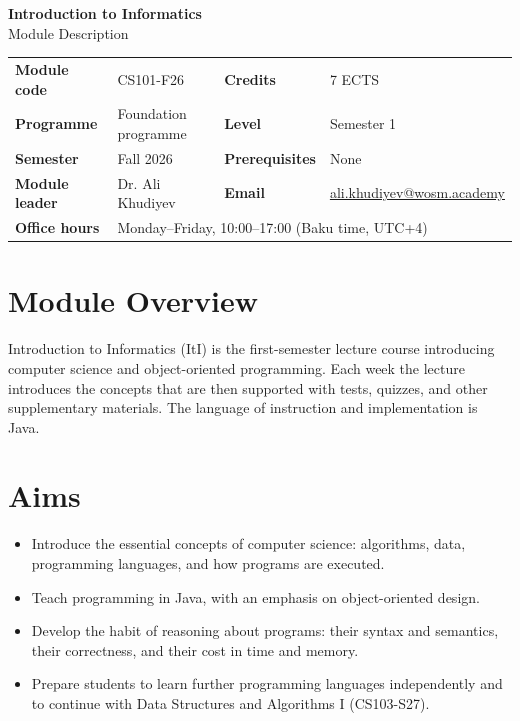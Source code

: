 \documentclass[11pt,a4paper]{article}
\makeatletter
\newcommand{\ModuleTitle}{Introduction to Informatics}
\newcommand{\ModuleCode}{CS101-F26}
\newcommand{\Programme}{Foundation programme}
\newcommand{\Level}{Semester 1}
\newcommand{\Semester}{Fall 2026}
\newcommand{\Credits}{7 ECTS}
\newcommand{\ModuleLeader}{Dr. Ali Khudiyev}
\newcommand{\Email}{ali.khudiyev@wosm.academy}
\newcommand{\OfficeHours}{Monday--Friday, 10:00--17:00 (Baku time, UTC+4)}
\newcommand{\Prerequisites}{None}
\makeatother
\begin{document}
\begin{center}
  {\LARGE\bfseries\color{accent} \ModuleTitle}\\[4pt]
  {\large Module Description}
\end{center}
\vspace{6pt}

\begin{tabularx}{\textwidth}{>{\bfseries}l X >{\bfseries}l X}
\toprule
Module code   & \ModuleCode    & Credits      & \Credits \\
Programme     & \Programme     & Level        & \Level \\
Semester      & \Semester      & Prerequisites & \Prerequisites \\
Module leader & \ModuleLeader  & Email        & \href{mailto:\Email}{\Email} \\
Office hours  & \multicolumn{3}{l}{\OfficeHours} \\
\bottomrule
\end{tabularx}

\section{Module Overview}
Introduction to Informatics (ItI) is the first-semester lecture course introducing
computer science and object-oriented programming. Each week the lecture introduces
the concepts that are then supported with tests, quizzes, and other supplementary
materials. The language of instruction and implementation is Java.

\section{Aims}
\begin{itemize}
  \item Introduce the essential concepts of computer science: algorithms, data,
        programming languages, and how programs are executed.
  \item Teach programming in Java, with an emphasis on object-oriented design.
  \item Develop the habit of reasoning about programs: their syntax and semantics,
        their correctness, and their cost in time and memory.
  \item Prepare students to learn further programming languages independently and
        to continue with Data Structures and Algorithms I (CS103-S27).
\end{itemize}
\end{document}
